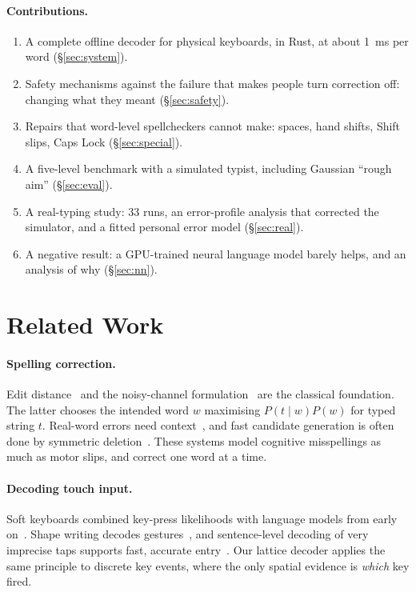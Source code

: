 \documentclass[11pt,a4paper]{article}
\begin{document}
\paragraph{Contributions.}
\begin{enumerate}[leftmargin=1.5em]
\item A complete offline decoder for physical keyboards, in Rust, at about 1~ms per word (\S\ref{sec:system}).
\item Safety mechanisms against the failure that makes people turn correction off: changing what they meant (\S\ref{sec:safety}).
\item Repairs that word-level spellcheckers cannot make: spaces, hand shifts, Shift slips, Caps Lock (\S\ref{sec:special}).
\item A five-level benchmark with a simulated typist, including Gaussian ``rough aim'' (\S\ref{sec:eval}).
\item A real-typing study: 33 runs, an error-profile analysis that corrected the simulator, and a fitted personal error model (\S\ref{sec:real}).
\item A negative result: a GPU-trained neural language model barely helps, and an analysis of why (\S\ref{sec:nn}).
\end{enumerate}

\section{Related Work}

\paragraph{Spelling correction.} Edit distance~\citep{damerau1964,levenshtein1966} and the noisy-channel formulation~\citep{kernighan1990,brill2000} are the classical foundation. The latter chooses the intended word $w$ maximising $P(t\mid w)P(w)$ for typed string $t$. Real-word errors need context~\citep{mays1991}, and fast candidate generation is often done by symmetric deletion~\citep{garbe2012symspell}. These systems model cognitive misspellings as much as motor slips, and correct one word at a time.

\paragraph{Decoding touch input.} Soft keyboards combined key-press likelihoods with language models from early on~\citep{goodman2002}. Shape writing decodes gestures~\citep{kristensson2004}, and sentence-level decoding of very imprecise taps supports fast, accurate entry~\citep{vertanen2015}. Our lattice decoder applies the same principle to discrete key events, where the only spatial evidence is \emph{which} key fired.
\end{document}
